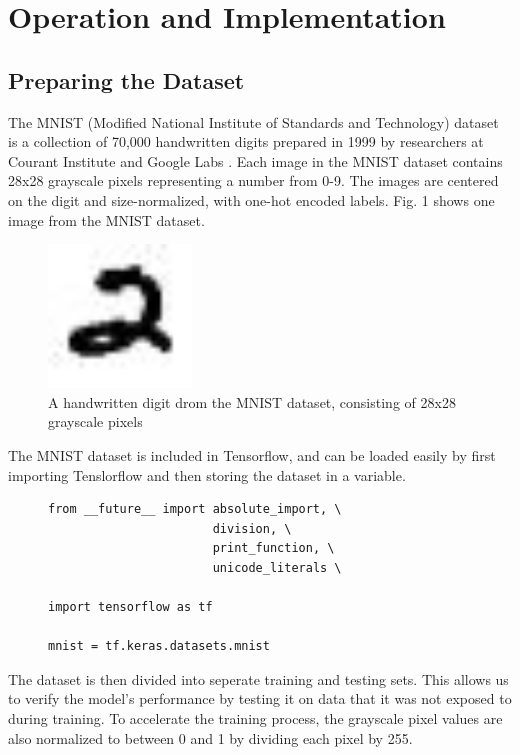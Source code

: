 \documentclass[transmag]{IEEEtran}
\begin{document}
\section{Operation and Implementation}

\subsection{Preparing the Dataset}

The MNIST (Modified National Institute of Standards and Technology) dataset
is a collection of 70,000 handwritten digits prepared in 1999 by researchers at
Courant Institute and Google Labs \cite{ref1}. Each image in the MNIST dataset
contains 28x28 grayscale pixels representing a number from 0-9. The images are
centered on the digit and size-normalized, with one-hot encoded labels. Fig. 1
shows one image from the MNIST dataset.

\begin{figure}[H]
  \centerline{\includegraphics[width=1.5in]{fig1}}
  \caption{A handwritten digit drom the MNIST dataset, consisting of 28x28
  grayscale pixels\label{fig1}}
\end{figure}

The MNIST dataset is included in Tensorflow, and can be loaded easily by first
importing Tenslorflow and then storing the dataset in a variable.

\begin{figure}[H]
\begin{Verbatim}[samepage=true]
from __future__ import absolute_import, \
                       division, \
                       print_function, \
                       unicode_literals \

import tensorflow as tf

mnist = tf.keras.datasets.mnist
\end{Verbatim}
\end{figure}

The dataset is then divided into seperate training and testing sets.
This allows us to verify the model's performance by testing it on data that it
was not exposed to during training. To accelerate the training process, the 
grayscale pixel values are also normalized to between 0 and 1 by 
dividing each pixel by 255.
\end{document}
